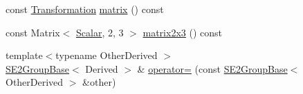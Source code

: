 \begin{DoxyCompactItemize}
const \hyperlink{class_sophus_1_1_s_e2_group_base_a82fe531d4b64813525d4ebd131da9bcd}{Transformation} \hyperlink{class_sophus_1_1_s_e2_group_base_a3d752d2ffd35f2e7eec1466fa451e774}{matrix} () const 
\item 
const Matrix$<$ \hyperlink{class_sophus_1_1_s_e2_group_base_a1bad7970c24437df7f4a34281ff147fe}{Scalar}, 2, 3 $>$ \hyperlink{class_sophus_1_1_s_e2_group_base_a9b312701ec4194c2db4febb83b90c828}{matrix2x3} () const 
\item 
{\footnotesize template$<$typename Other\+Derived $>$ }\\\hyperlink{class_sophus_1_1_s_e2_group_base}{S\+E2\+Group\+Base}$<$ Derived $>$ \& \hyperlink{class_sophus_1_1_s_e2_group_base_abd50c1bef40dc37ac2bc3b707d74d3fc}{operator=} (const \hyperlink{class_sophus_1_1_s_e2_group_base}{S\+E2\+Group\+Base}$<$ Other\+Derived $>$ \&other)\hypertarget{class_sophus_1_1_s_e2_group_base_abd50c1bef40dc37ac2bc3b707d74d3fc}{}\label{class_sophus_1_1_s_e2_group_base_abd50c1bef40dc37ac2bc3b707d74d3fc}


\end{DoxyCompactItemize}
